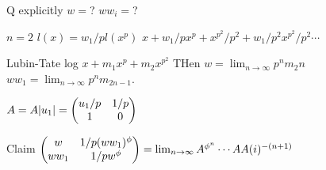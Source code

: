 Q explicitly $w=$?
$ww_i=$?

$n=2$ $l(x)= w_1/p l(x^p)$
$x+w_1/p x^p + x^{p^2}/p^2+ w_1/p^2 x^{p^2}/p^2 \cdots$

Lubin-Tate log
$x+ m_1x^p + m_2 x^{p^2}$
THen $w= \lim_{n \to \infty} p^n m_2n$
$ww_1= \lim_{n \to \infty} p^n m_{2n-1}$.

$A= A|u_1|= \begin{pmatrix} u_1/p & 1/p \\ 1 & 0 \end{pmatrix}$

Claim $\begin{pmatrix} w & 1/p(ww_1)^\phi \\ ww_1 & 1/pw^\phi \end{pmatrix}= \lim_{n \to \infty} A^{\phi^n} \cdots AA(i)^{-(n+1)}$





































